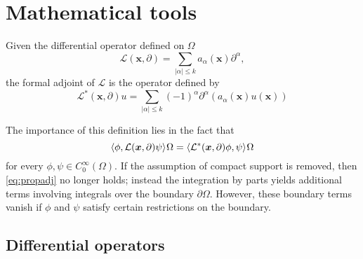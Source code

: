 \chapter{Mathematical tools}
\label{app:math}

\begin{definition}\label{def:foradj}
Given the differential operator defined on $\Omega$
\begin{equation}
\mathcal{L}(\bm{x}, \partial) =\sum_{|\alpha| \le k} a_\alpha(\bm{x})\partial^\alpha,
\end{equation}
the formal adjoint of $\mathcal{L}$ is the operator defined by
\begin{equation}
\mathcal{L}^*(\bm{x}, \partial)u = \sum_{|\alpha| \le k} (-1)^\alpha \partial^\alpha(a_\alpha(\bm{x}) u(\bm{x}))
\end{equation}
\end{definition}
The importance of this definition lies in the fact that
\begin{equation}\label{eq:propadj}
\langle \phi,  \mathcal{L}(\bm{x}, \partial)\psi \rangle_{}{\Omega} = \langle \mathcal{L}^*(\bm{x}, \partial)\phi, \psi \rangle_{}{\Omega}
\end{equation}
for every $\phi, \psi \in C^\infty_0(\Omega)$. If the assumption of compact support is removed, then \eqref{eq:propadj} no longer holds; instead the integration by parts yields additional terms involving integrals over the boundary $\partial\Omega$. However, these boundary terms vanish if $\phi$ and $\psi$ satisfy certain restrictions on the boundary.



\section{Differential operators}

